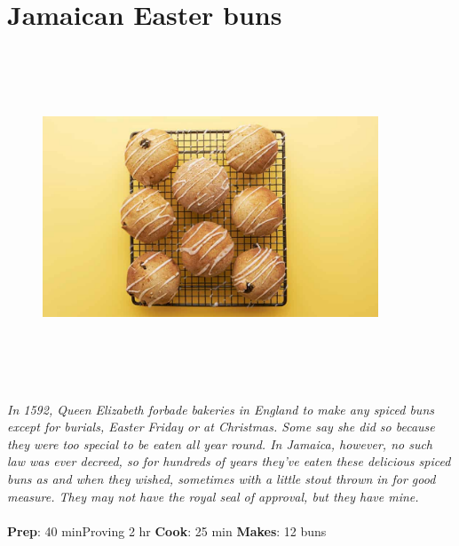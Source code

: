 \documentclass{book}
\begin{document}
\section{Jamaican Easter buns}
\begin{figure}
\centering\includegraphics[width=10cm,height=10cm,keepaspectratio]{Recipe_Pictures/Jamaican_Easter_buns.png}
\end{figure}
\emph{In 1592, Queen Elizabeth forbade bakeries in England to make any spiced buns except for burials, Easter Friday or at Christmas. Some say she did so because they were too special to be eaten all year round. In Jamaica, however, no such law was ever decreed, so for hundreds of years they’ve eaten these delicious spiced buns as and when they wished, sometimes with a little stout thrown in for good measure. They may not have the royal seal of approval, but they have mine.}\\\\ 
\textbf{Prep}: 40 minProving 2 hr
\textbf{Cook}: 25 min
\textbf{Makes}: 12 buns
\end{document}
